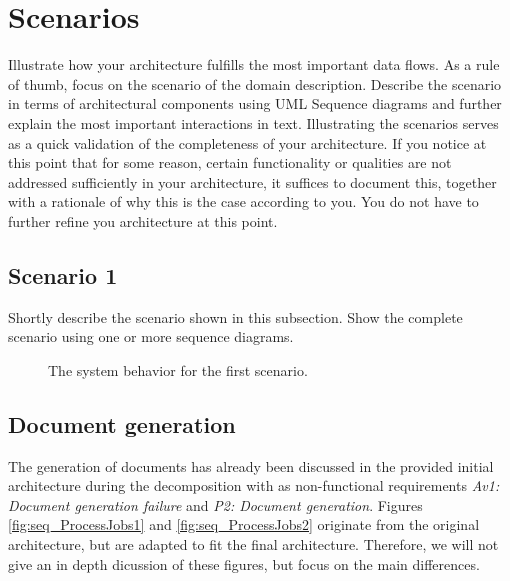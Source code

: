 \documentclass[a4paper,10pt]{article}
\begin{document}
\section{Scenarios}\label{sec:scenarios}
Illustrate how your architecture fulfills the most important data flows.
As a rule of thumb, focus on the scenario of the domain description.
Describe the scenario in terms of architectural components using UML Sequence
diagrams and further explain the most important interactions in text.
Illustrating the scenarios serves as a quick validation of the completeness of
your architecture.
If you notice at this point that for some reason, certain functionality or
qualities are not addressed sufficiently in your architecture, it suffices to
document this, together with a rationale of why this is the case according to
you.
You do not have to further refine you architecture at this point.

\subsection{Scenario 1}
Shortly describe the scenario shown in this subsection.
Show the complete scenario using one or more sequence diagrams.

\begin{figure}[!htp]
    \centering
    \caption{The system behavior for the first scenario.
        }\label{fig:seq_scenario1}
\end{figure}

\subsection{Document generation}
\label{scenario:DocumentGeneration}
The generation of documents has already been discussed in the provided initial architecture during the decomposition with as non-functional requirements \emph{Av1: Document generation failure} and \emph{P2: Document generation}. Figures \ref{fig:seq_ProcessJobs1} and \ref{fig:seq_ProcessJobs2} originate from the original architecture, but are adapted to fit the final architecture. Therefore, we will not give an in depth dicussion of these figures, but focus on the main differences.\\
\end{document}

